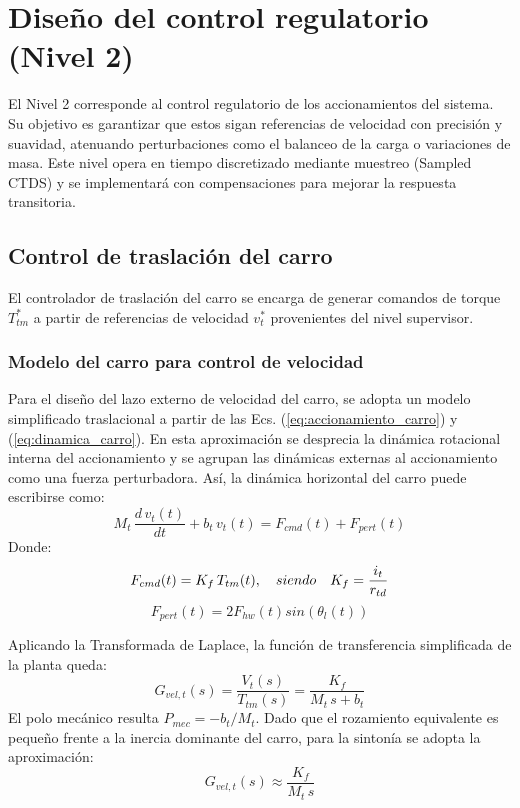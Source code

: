 \section{Diseño del control regulatorio (Nivel 2)}
El Nivel 2 corresponde al control regulatorio de los accionamientos del sistema. Su objetivo es garantizar que estos
sigan referencias de velocidad con precisión y suavidad, atenuando perturbaciones como el balanceo de la carga o variaciones de masa. Este nivel 
opera en tiempo discretizado mediante muestreo (Sampled CTDS) y se implementará con compensaciones para mejorar la respuesta transitoria.


\subsection{Control de traslación del carro}
El controlador de traslación del carro se encarga de generar comandos de torque $T_{tm}^\ast$ a partir de 
referencias de velocidad $v_{t}^\ast$ provenientes del nivel supervisor.

\subsubsection{Modelo del carro para control de velocidad}
Para el diseño del lazo externo de velocidad del carro, se adopta un modelo simplificado traslacional a partir de las Ecs. (\ref{eq:accionamiento_carro})
y (\ref{eq:dinamica_carro}). En esta aproximación se desprecia la dinámica rotacional interna 
del accionamiento y se agrupan las dinámicas externas al accionamiento como una fuerza perturbadora. Así, la dinámica 
horizontal del carro puede escribirse como:
\begin{equation}
    M_t\,\frac{d \, v_t(t)}{dt} + b_t\,v_t(t) = F_{cmd}(t) + F_{pert}(t) 
\end{equation}
Donde:
\begin{equation*}
    F_{cmd}(t) = K_f\,T_{tm}(t), \quad siendo\quad K_f = \frac{i_t}{r_{td}} \\
\end{equation*}
\begin{equation*}
    F_{pert}(t) = 2F_{hw}(t)sin(\theta_l(t))
\end{equation*}

Aplicando la Transformada de Laplace, la función de transferencia simplificada de la planta queda:
\begin{equation}
    G_{vel,t}(s) = \frac{V_t(s)}{T_{tm}(s)} = \frac{K_f}{M_t\,s + b_t}
\end{equation}
El polo mecánico resulta $P_{mec} = -b_t/M_t$. Dado que el rozamiento equivalente es pequeño frente a la inercia dominante del carro, para la sintonía se adopta la aproximación:
\begin{equation}
    G_{vel,t}(s) \approx \frac{K_f}{M_t\,s}
\end{equation}

